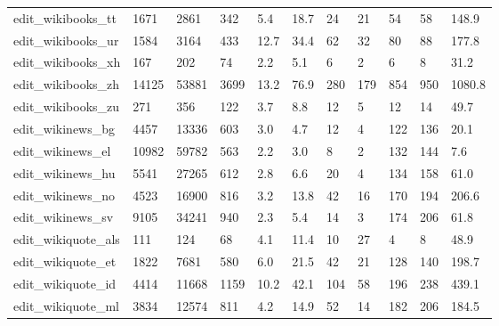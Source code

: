 \begin{longtable}{lllllllllll}
 edit\_wikibooks\_tt                                  & 1671       & 2861      & 342   & 5.4    & 18.7   & 24    & 21     & 54     & 58     & 148.9   \\
 edit\_wikibooks\_ur                                  & 1584       & 3164      & 433   & 12.7   & 34.4   & 62    & 32     & 80     & 88     & 177.8   \\
 edit\_wikibooks\_xh                                  & 167        & 202       & 74    & 2.2    & 5.1    & 6     & 2      & 6      & 8      & 31.2    \\
 edit\_wikibooks\_zh                                  & 14125      & 53881     & 3699  & 13.2   & 76.9   & 280   & 179    & 854    & 950    & 1080.8  \\
 edit\_wikibooks\_zu                                  & 271        & 356       & 122   & 3.7    & 8.8    & 12    & 5      & 12     & 14     & 49.7    \\
 edit\_wikinews\_bg                                   & 4457       & 13336     & 603   & 3.0    & 4.7    & 12    & 4      & 122    & 136    & 20.1    \\
 edit\_wikinews\_el                                   & 10982      & 59782     & 563   & 2.2    & 3.0    & 8     & 2      & 132    & 144    & 7.6     \\
 edit\_wikinews\_hu                                   & 5541       & 27265     & 612   & 2.8    & 6.6    & 20    & 4      & 134    & 158    & 61.0    \\
 edit\_wikinews\_no                                   & 4523       & 16900     & 816   & 3.2    & 13.8   & 42    & 16     & 170    & 194    & 206.6   \\
 edit\_wikinews\_sv                                   & 9105       & 34241     & 940   & 2.3    & 5.4    & 14    & 3      & 174    & 206    & 61.8    \\
 edit\_wikiquote\_als                                 & 111        & 124       & 68    & 4.1    & 11.4   & 10    & 27     & 4      & 8      & 48.9    \\
 edit\_wikiquote\_et                                  & 1822       & 7681      & 580   & 6.0    & 21.5   & 42    & 21     & 128    & 140    & 198.7   \\
 edit\_wikiquote\_id                                  & 4414       & 11668     & 1159  & 10.2   & 42.1   & 104   & 58     & 196    & 238    & 439.1   \\
 edit\_wikiquote\_ml                                  & 3834       & 12574     & 811   & 4.2    & 14.9   & 52    & 14     & 182    & 206    & 184.5   \\

\end{longtable}
